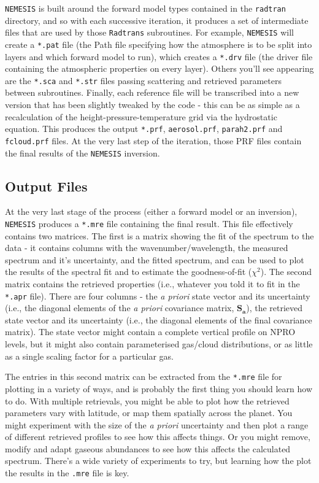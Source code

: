 \documentclass[final,5p,times,twocolumn,authoryear]{elsarticle}
\begin{document}
\verb#NEMESIS# is built around the forward model types contained in the \verb#radtran# directory, and so with each successive iteration, it produces a set of intermediate files that are used by those \verb#Radtrans# subroutines.  For example, \verb#NEMESIS# will create a \verb#*.pat# file (the Path file specifying how the atmosphere is to be split into layers and which forward model to run), which creates a \verb#*.drv# file (the driver file containing the atmospheric properties on every layer).  Others you'll see appearing are the \verb#*.sca# and \verb#*.str# files passing scattering and retrieved parameters between subroutines.  Finally, each reference file will be transcribed into a new version that has been slightly tweaked by the code - this can be as simple as a recalculation of the height-pressure-temperature grid via the hydrostatic equation.  This produces the output \verb#*.prf#, \verb#aerosol.prf#, \verb#parah2.prf# and \verb#fcloud.prf# files.  At the very last step of the iteration, those PRF files contain the final results of the \verb#NEMESIS# inversion.

\subsection{Output Files}

At the very last stage of the process (either a forward model or an inversion), \verb#NEMESIS# produces a \verb#*.mre# file containing the final result.  This file effectively contains two matrices.  The first is a matrix showing the fit of the spectrum to the data - it contains columns with the wavenumber/wavelength, the measured spectrum and it's uncertainty, and the fitted spectrum, and can be used to plot the results of the spectral fit and to estimate the goodness-of-fit ($\chi^2$).  The second matrix contains the retrieved properties (i.e., whatever you told it to fit in the \verb#*.apr# file).  There are four columns - the \textit{a priori} state vector and its uncertainty (i.e., the diagonal elements of the \textit{a priori} covariance matrix, $\mathbf{S_a}$), the retrieved state vector and its uncertainty (i.e., the diagonal elements of the final covariance matrix).  The state vector might contain a complete vertical profile on NPRO levels, but it might also contain parameterised gas/cloud distributions, or as little as a single scaling factor for a particular gas.  

The entries in this second matrix can be extracted from the \verb#*.mre# file for plotting in a variety of ways, and is probably the first thing you should learn how to do.  With multiple retrievals, you might be able to plot how the retrieved parameters vary with latitude, or map them spatially across the planet.  You might experiment with the size of the \textit{a priori} uncertainty and then plot a range of different retrieved profiles to see how this affects things.  Or you might remove, modify and adapt gaseous abundances to see how this affects the calculated spectrum.  There's a wide variety of experiments to try, but learning how the plot the results in the \verb#.mre# file is key.
\end{document}
